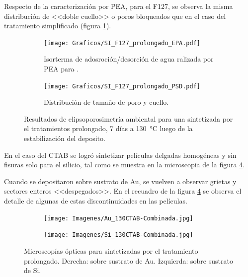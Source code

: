 {		Respecto de la caracterización por PEA, para el F127, se observa la misma distribución de <<doble cuello>> o poros bloqueados que en el caso del tratamiento simplificado (figura \ref{fig:F127_prolongado_EPA}). 

		 \begin{figure}[!ht]
			  	\begin{subfigure}[t]{0.495\textwidth}
			  	\texttt{[image: Graficos/SI\_F127\_prolongado\_EPA.pdf]}
				\caption{Isorterma de adosroción/desorción de agua ralizada por PEA para \pdmF.}
				\label{fig:F127_prolongado_EPA}
				\end{subfigure}
				\begin{subfigure}[t]{0.495\textwidth}
			  	\texttt{[image: Graficos/SI\_F127\_prolongado\_PSD.pdf]}
				\caption{Distribución de tamaño de poro y cuello.\\ }
				\label{fig:F127_prolongado_PSD}
				\end{subfigure}
				\caption[Elipsoporosimetría \pdmF\space tratamiento prolongado.]{Resultados de elipsoporosimetría ambiental para una \pdmF\space sintetizada por el tratamientos prolongado, 7 días a \SI{130}{\celsius} luego de la estabilización del deposito.}
		 		\end{figure}

		En el caso del CTAB se logró sintetizar películas delgadas homogéneas y sin fisuras solo para el silicio, tal como 
		se muestra en la microscopia de la figura \ref{fig:Microscopia_CTAB_prolongado}. 

		Cuando se depositaron sobre sustrato de Au, se vuelven a observar grietas y sectores enteros <<despegados>>. En el recuadro de la figura \ref{fig:Microscopia_CTAB_prolongado} se observa el detalle de algunas de estas discontinuidades en las películas. 		
		 \begin{figure}[!th]
	 	   	    \begin{subfigure}[t]{0.49\textwidth}
		       	\texttt{[image: Imagenes/Au\_130CTAB-Combinada.jpg]}
		   		\end{subfigure}
		   		\begin{subfigure}[t]{0.49\textwidth}
		   	    \texttt{[image: Imagenes/Si\_130CTAB-Combinada.jpg]}
		   		\end{subfigure}
				 \caption[Microscopía óptica \pdmC\space tratamiento prolongado.]{Microscopías ópticas para \pdmC\space sintetizadas por el tratamiento prolongado. Derecha: sobre sustrato de Au. Izquierda: sobre sustrato de Si.}
				 \label{fig:Microscopia_CTAB_prolongado}	
			     \end{figure}	
			     
}
